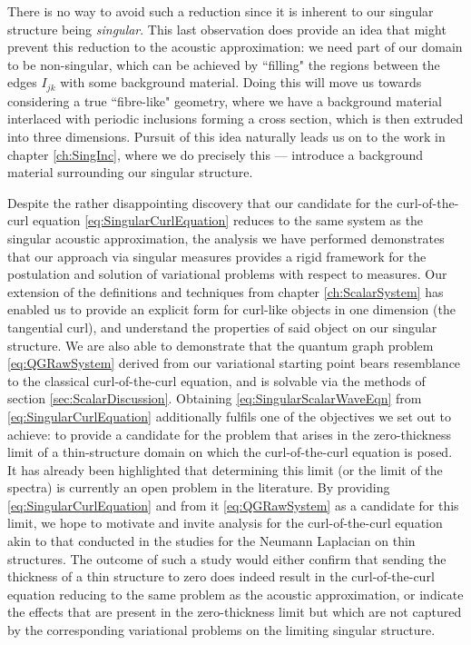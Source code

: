 There is no way to avoid such a reduction since it is inherent to our singular structure being \emph{singular}.
This last observation does provide an idea that might prevent this reduction to the acoustic approximation: we need part of our domain to be non-singular, which can be achieved by ``filling" the regions between the edges $I_{jk}$ with some background material.
Doing this will move us towards considering a true ``fibre-like" geometry, where we have a background material interlaced with periodic inclusions forming a cross section, which is then extruded into three dimensions.
Pursuit of this idea naturally leads us on to the work in chapter \ref{ch:SingInc}, where we do precisely this --- introduce a background material surrounding our singular structure.

Despite the rather disappointing discovery that our candidate for the curl-of-the-curl equation \eqref{eq:SingularCurlEquation} reduces to the same system as the singular acoustic approximation, the analysis we have performed demonstrates that our approach via singular measures provides a rigid framework for the postulation and solution of variational problems with respect to measures.
Our extension of the definitions and techniques from chapter \ref{ch:ScalarSystem} has enabled us to provide an explicit form for curl-like objects in one dimension (the tangential curl), and understand the properties of said object on our singular structure.
We are also able to demonstrate that the quantum graph problem \eqref{eq:QGRawSystem} derived from our variational starting point bears resemblance to the classical curl-of-the-curl equation, and is solvable via the methods of section \ref{sec:ScalarDiscussion}.
Obtaining \eqref{eq:SingularScalarWaveEqn} from \eqref{eq:SingularCurlEquation} additionally fulfils one of the objectives we set out to achieve: to provide a candidate for the problem that arises in the zero-thickness limit of a thin-structure domain on which the curl-of-the-curl equation is posed.
It has already been highlighted that determining this limit (or the limit of the spectra) is currently an open problem in the literature.
By providing \eqref{eq:SingularCurlEquation} and from it \eqref{eq:QGRawSystem} as a candidate for this limit, we hope to motivate and invite analysis for the curl-of-the-curl equation akin to that conducted in the studies \cite{kuchment2001convergence, kuchment2003asymptotics, exner2005convergence, post2012spectral} for the Neumann Laplacian on thin structures.
The outcome of such a study would either confirm that sending the thickness of a thin structure to zero does indeed result in the curl-of-the-curl equation reducing to the same problem as the acoustic approximation, or indicate the effects that are present in the zero-thickness limit but which are not captured by the corresponding variational problems on the limiting singular structure.
